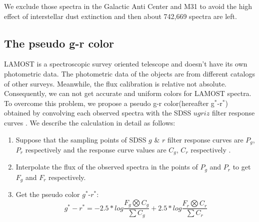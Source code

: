 \documentclass[referee]{raa}            %
\begin{document}
We exclude those spectra in the Galactic Anti Center and M31 to avoid the high effect of interstellar dust  extinction
and then about 742,669 spectra are left.
\subsection{The pseudo g-r color}
LAMOST is a spectroscopic survey oriented telescope and doesn't have its own photometric data.
The photometric data of the objects are from different catalogs of other surveys.
Meanwhile, the flux calibration is relative not absolute\citep{bai2012lamost}.
Consequently, we can not get accurate and uniform  colors for LAMOST spectra.
To overcome this problem, we propose a pseudo g-r color(hereafter g$^*$-r$^*$) obtained by convolving each observed spectra with the SDSS $ugriz$ filter response curves .
We describe the calculation in detail  as follows:
\begin{enumerate}
 \item Suppose that the sampling points of SDSS $g$ \& $r$ filter response curves are $P_g$, $P_r$ respectively and the response curve values are $C_g$, $C_r$ respectively   .
 \item Interpolate the  flux of the observed spectra in the points of $P_g$ and $P_r$  to get $F_g$ and $F_r$ respectively.
 \item Get the pseudo color $g^*$-$r^*$:
 \begin{equation}
        g^*-r^*=-2.5*log\frac{F_g\bigotimes C_g}{\sum C_g} +2.5*log\frac{ F_r\bigotimes C_r}{\sum C_r}
       \end{equation}
\end{enumerate}
\end{document}
